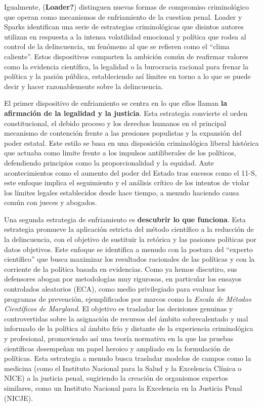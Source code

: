 \documentclass[
  spanish,
  letterpaper,
  DIV=11,
  numbers=noendperiod]{scrreprt}
\begin{document}
Igualmente, (\textbf{Loader?}) distinguen nuevas formas de compromiso
criminológico que operan como mecanismos de enfriamiento de la cuestion
penal. Loader y Sparks identifican una serie de estrategias
criminológicas que disintos autores utilizan en respuesta a la intensa
volatilidad emocional y política que rodea al control de la
delincuencia, un fenómeno al que se refieren como el ``clima caliente''.
Estos dispositivos comparten la ambición común de reafirmar valores como
la evidencia científica, la legalidad o la burocracia racional para
frenar la política y la pasión pública, estableciendo así límites en
torno a lo que se puede decir y hacer razonablemente sobre la
delincuencia.

El primer dispositivo de enfriamiento se centra en lo que ellos llaman
\textbf{la afirmación de la legalidad y la justicia}. Esta estrategia
convierte el orden constitucional, el debido proceso y los derechos
humanos en el principal mecanismo de contención frente a las presiones
populistas y la expansión del poder estatal. Este estilo se basa en una
disposición criminológica liberal histórica que actuaba como limite
frente a los impulsos antiliberales de los políticos, defendiendo
principios como la proporcionalidad y la equidad. Ante acontecimientos
como el aumento del poder del Estado tras sucesos como el 11-S, este
enfoque implica el seguimiento y el análisis crítico de los intentos de
violar los límites legales establecidos desde hace tiempo, a menudo
haciendo causa común con jueces y abogados.

Una segunda estrategia de enfriamiento es \textbf{descubrir lo que
funciona}. Esta estrategia promueve la aplicación estricta del método
científico a la reducción de la delincuencia, con el objetivo de
sustituir la retórica y las pasiones políticas por datos objetivos. Este
enfoque se identifica a menudo con la postura del ``experto científico''
que busca maximizar los resultados racionales de las políticas y con la
corriente de la política basada en evidencias. Como ya hemos discutiro,
sus defensores abogan por metodologías muy rigurosas, en particular los
ensayos controlados aleatorios (ECA), como medio privilegiado para
evaluar los programas de prevención, ejemplificados por marcos como la
\emph{Escala de Métodos Científicos de Maryland}. El objetivo es
trasladar las decisiones genuinas y controvertidas sobre la asignación
de recursos del ámbito sobrecalentado y mal informado de la política al
ámbito frío y distante de la experiencia criminológica y profesional,
promoviendo así una teoría normativa en la que las pruebas científicas
desempeñan un papel heroico y ampliado en la formulación de políticas.
Esta estrategia a menudo busca trasladar modelos de campos como la
medicina (como el Instituto Nacional para la Salud y la Excelencia
Clínica o NICE) a la justicia penal, sugiriendo la creación de
organismos expertos similares, como un Instituto Nacional para la
Excelencia en la Justicia Penal (NICJE).
\end{document}
